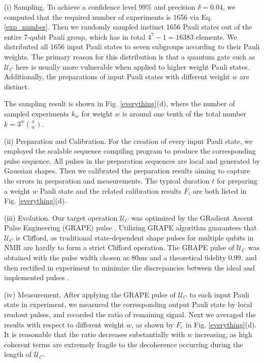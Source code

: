 \documentclass[prl,twocolumn,showpacs]{revtex4-1}
\begin{document}
(i) Sampling. To achieve a confidence level 99\% and precision $\delta = 0.04$, we computed that the required number of experiments is 1656 via Eq. \ref{exp_number}. Then we randomly sampled instinct 1656 Pauli states out of the entire 7-qubit Pauli group, which has in total $4^7-1=16383$ elements. We distributed all 1656 input Pauli states to seven subgroups according to their Pauli weights. The primary reason for this distribution is that a quantum gate such as $\mathcal{U}_{C}$ here is usually more vulnerable when applied to higher weight Pauli states. Additionally, the preparations of input Pauli states with different weight $w$ are distinct.

The sampling result is shown in Fig. \ref{everything}(d), where the number of sampled experiments $k_w$ for weight $w$ is around one tenth of the total number $k = 3^w\binom{n}{w}$.

(ii) Preparation and Calibration. For the creation of every input Pauli state, we employed the scalable sequence compiling program \cite{Ryan2008} to produce the corresponding pulse sequence. All pulses in the preparation sequences are local and generated by Gaussian shapes. Then we calibrated the preparation results aiming to capture the errors in preparation and measurements. The typical duration $t$ for preparing a weight $w$ Pauli state and the related calibration results $F_i$ are both listed in Fig. \ref{everything}(d).

(iii) Evolution. Our target operation $\mathcal{U}_{C}$ was optimized by the GRadient Ascent Pulse Engineering (GRAPE) pulse \cite{Khaneja2005}. Utilizing GRAPE algorithm guarantees that $\mathcal{U}_{C}$ is Clifford, as traditional state-dependent shape pulses for multiple qubits in NMR are hardly to form a strict Clifford operation. The GRAPE pulse of $\mathcal{U}_{C}$ was obtained with the pulse width chosen as 80ms and a theoretical fidelity 0.99, and then rectified in experiment to minimize the discrepancies between the ideal and implemented pulses \cite{Weinstein2004}.

(iv) Measurement. After applying the GRAPE pulse of $\mathcal{U}_{C}$ to each input Pauli state in experiment, we measured the corresponding output Pauli state by local readout pulses, and recorded the ratio of remaining signal.  Next we averaged the results with respect to different weight $w$, as shown by $F_e$ in Fig. \ref{everything}(d). It is reasonable that the ratio decreases substantially with $w$ increasing, as high coherent terms are extremely fragile to the decoherence occurring during the length of $\mathcal{U}_{C}$.
\end{document}
